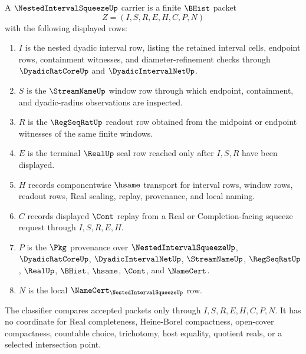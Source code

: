 \begin{definition}
\label{def:nested-interval-squeeze-carrier}
A $\NestedIntervalSqueezeUp$ carrier is a finite $\BHist$ packet
$$
Z=(I,S,R,E,H,C,P,N)
$$
with the following displayed rows:
\begin{enumerate}
\item $I$ is the nested dyadic interval row, listing the retained interval cells, endpoint rows, containment witnesses, and diameter-refinement checks through $\DyadicRatCoreUp$ and $\DyadicIntervalNetUp$.
\item $S$ is the $\StreamNameUp$ window row through which endpoint, containment, and dyadic-radius observations are inspected.
\item $R$ is the $\RegSeqRatUp$ readout row obtained from the midpoint or endpoint witnesses of the same finite windows.
\item $E$ is the terminal $\RealUp$ seal row reached only after $I,S,R$ have been displayed.
\item $H$ records componentwise $\hsame$ transport for interval rows, window rows, readout rows, Real sealing, replay, provenance, and local naming.
\item $C$ records displayed $\Cont$ replay from a Real or Completion-facing squeeze request through $I,S,R,E,H$.
\item $P$ is the $\Pkg$ provenance over $\NestedIntervalSqueezeUp$, $\DyadicRatCoreUp$, $\DyadicIntervalNetUp$, $\StreamNameUp$, $\RegSeqRatUp$, $\RealUp$, $\BHist$, $\hsame$, $\Cont$, and $\NameCert$.
\item $N$ is the local $\NameCert_{\NestedIntervalSqueezeUp}$ row.
\end{enumerate}
The classifier compares accepted packets only through $I,S,R,E,H,C,P,N$. It has no coordinate for Real completeness, Heine-Borel compactness, open-cover compactness, countable choice, trichotomy, host equality, quotient reals, or a selected intersection point.
\end{definition}

